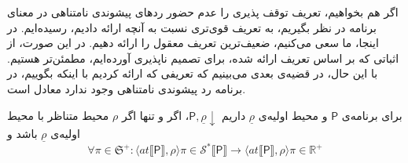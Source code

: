اگر هم بخواهیم، تعریف توقف پذیری را عدم حضور ردهای پیشوندی نامتناهی در معنای برنامه در نظر بگیریم، به تعریف قوی‌تری نسبت به آنچه ارائه دادیم، رسیده‌ایم. در اینجا، ما سعی می‌کنیم، ضعیف‌ترین تعریف معقول را ارائه دهیم. در این صورت، از اثباتی که بر اساس تعریف ارائه شده، برای تصمیم ناپذیری آورده‌ایم، مطمئن‌تر هستیم. با این حال، در قضیه‌ی بعدی می‌بینیم که تعریفی که ارائه کردیم با اینکه بگوییم، در برنامه رد پیشوندی نامتناهی وجود ندارد معادل است.
\begin{thm}
	برای برنامه‌ی $\mathsf{P}$ و محیط اولیه‌ی $\underline{\rho}$ داریم $\mathsf{P} , \underline{\rho} \downarrow $، اگر و تنها اگر $\rho$ محیط متناظر با محیط اولیه‌ی $\underline{\rho}$ باشد و
	$$\forall \pi \in \mathfrak{S^{+}} : 
	\langle at \llbracket \mathsf{P} \rrbracket , \rho \rangle \pi \in \mathcal{S^*} \llbracket \mathsf{P} \rrbracket \rightarrow
	\langle at \llbracket \mathsf{P} \rrbracket , \rho \rangle \pi \in \mathbb{R^+}$$
	 
\end{thm}
